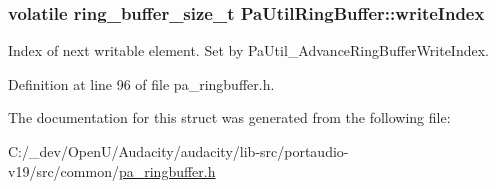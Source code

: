 \subsubsection[{\texorpdfstring{write\+Index}{writeIndex}}]{\setlength{\rightskip}{0pt plus 5cm}volatile {\bf ring\+\_\+buffer\+\_\+size\+\_\+t} Pa\+Util\+Ring\+Buffer\+::write\+Index}\hypertarget{struct_pa_util_ring_buffer_ad2ae4e486eca6d273eed2e06f1d57aec}{}\label{struct_pa_util_ring_buffer_ad2ae4e486eca6d273eed2e06f1d57aec}
Index of next writable element. Set by Pa\+Util\+\_\+\+Advance\+Ring\+Buffer\+Write\+Index. 

Definition at line 96 of file pa\+\_\+ringbuffer.\+h.



The documentation for this struct was generated from the following file\+:\begin{DoxyCompactItemize}
\item 
C\+:/\+\_\+dev/\+Open\+U/\+Audacity/audacity/lib-\/src/portaudio-\/v19/src/common/\hyperlink{pa__ringbuffer_8h}{pa\+\_\+ringbuffer.\+h}\end{DoxyCompactItemize}
